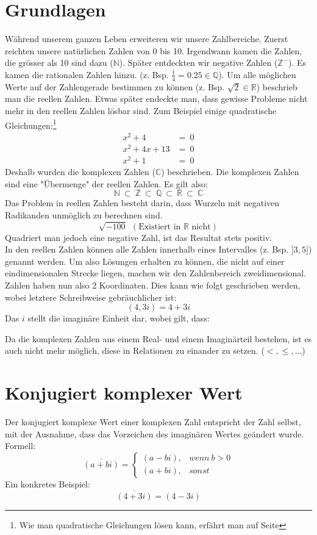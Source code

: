 \documentclass[12pt,a4paper]{scrbook}
\begin{document}
\section{Grundlagen}
Während unserem ganzen Leben erweiteren wir unsere Zahlbereiche. Zuerst
reichten unsere natürlichen Zahlen von 0 bis 10. Irgendwann kamen die Zahlen,
die grösser als 10 sind dazu ($\mathbb{N}$). Später entdeckten wir
negative Zahlen ($\mathbb{Z}^-$). Es kamen die rationalen Zahlen hinzu.
(z. Bsp. $\frac{1}{4} = 0.25 \in \mathbb{Q}$). Um alle möglichen Werte auf
der Zahlengerade bestimmen zu können (z. Bsp. $\sqrt{2} \in \mathbb{R}$)
beschrieb man die reellen Zahlen. Etwas später endeckte man, dass
gewisse Probleme nicht mehr in den reellen Zahlen lösbar sind.
Zum Beispiel einige quadratische Gleichungen:\footnote{Wie man quadratische Gleichungen lösen kann,
erfährt man auf Seite \pageref{quadratische_gleichungen}}
\begin{eqnarray*}
x^2+4 & = ~ 0\\
x^2+4x+13 & = ~ 0\\
x^2+1 & = ~ 0
\end{eqnarray*}
Deshalb wurden die komplexen Zahlen ($\mathbb{C}$) beschrieben. Die komplexen
Zahlen sind eine "Übermenge" der reellen Zahlen. Es gilt also:
\[\mathbb{N} ~ \subset ~ \mathbb{Z} ~ \subset ~ \mathbb{Q} ~ \subset ~ \mathbb{R} ~ \subset ~ \mathbb{C}\]
Das Problem in reellen Zahlen besteht darin, dass Wurzeln mit negativen
Radikanden unmöglich zu berechnen sind.
\[\sqrt{-100} ~~ (\text{Existiert in }\mathbb{R} \text{ nicht})\]
Quadriert man jedoch eine negative Zahl, ist das Resultat stets positiv.\\
In den reellen Zahlen können alle Zahlen innerhalb eines Intervalles (z. Bsp.
$]3, 5]$) genannt werden. Um also Lösungen erhalten zu können, die nicht auf
einer eindimensionalen Strecke liegen, machen wir den Zahlenbereich zweidimensional.
Zahlen haben nun also 2 Koordinaten. Dies kann wie folgt geschrieben werden, wobei
letztere Schreibweise gebräuchlicher ist:
\[(4, 3i) = 4 + 3i\]
Das $i$ stellt die imaginäre Einheit dar, wobei gilt, dass:
\begin{center}
\fbox{\parbox{4cm}{\[i^2 = -1\]}}
\end{center}
Da die komplexen Zahlen aus einem Real- und einem Imaginärteil bestehen, ist es auch nicht mehr möglich,
diese in Relationen zu einander zu setzen. ($<, \leq, ...$)

\section{Konjugiert komplexer Wert}
Der konjugiert komplexe Wert einer komplexen Zahl entspricht der Zahl selbst,
mit der Ausnahme, dass das Vorzeichen des imaginären Wertes geändert wurde. Formell:
\[\overline{(a+bi)} = \left\lbrace \begin{array}{ll} (a-bi), & wenn~b > 0\\ (a+bi), & sonst \end{array} \right.\]
Ein konkretes Beispiel:
\[\overline{(4+3i)} = (4-3i)\]
\end{document}
